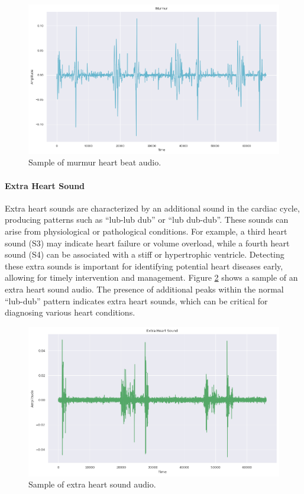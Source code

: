 \begin{figure}[h]
    \centering
    \includegraphics[width=\columnwidth]{../images/murmur_heart_beat_audio.png}
    \caption{Sample of murmur heart beat audio.}
    \label{fig:murmur_heart_beat_audio}
\end{figure}

\paragraph{Extra Heart Sound}
Extra heart sounds are characterized by an additional sound in the cardiac cycle, producing patterns such as ``lub-lub dub'' or ``lub dub-dub''.
These sounds can arise from physiological or pathological conditions. For example, a third heart sound (S3) may indicate heart failure or volume overload,
while a fourth heart sound (S4) can be associated with a stiff or hypertrophic ventricle.
Detecting these extra sounds is important for identifying potential heart diseases early, allowing for timely intervention and management.
Figure \ref{fig:extrahls_heart_beat_audio} shows a sample of an extra heart sound audio.
The presence of additional peaks within the normal ``lub-dub'' pattern indicates extra heart sounds, which can be
critical for diagnosing various heart conditions.

\begin{figure}[h]
    \centering
    \includegraphics[width=\columnwidth]{../images/extrahls_heart_beat_audio.png}
    \caption{Sample of extra heart sound audio.}
    \label{fig:extrahls_heart_beat_audio}
\end{figure}

